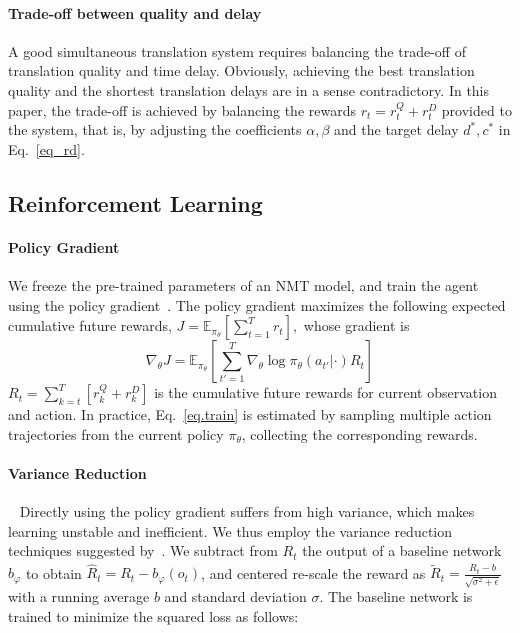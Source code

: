 \paragraph{Trade-off between quality and delay}
A good simultaneous translation system requires balancing the trade-off of translation quality and time delay. Obviously, achieving the best translation quality and the shortest translation delays are in a sense contradictory. In this paper, the trade-off is achieved by balancing the rewards $r_t = r_t^Q + r_t^D$ provided to the system, that is, by adjusting the coefficients $\alpha,\beta$ and the target delay $d^*, c^*$ in Eq.~\ref{eq_rd}. 

\subsection{Reinforcement Learning}

\paragraph{Policy Gradient}
We freeze the pre-trained parameters of an NMT model, and train the agent using the policy gradient~\cite{williams1992simple}. The policy gradient maximizes the following expected cumulative future rewards,
$     J = \mathbb{E}_{\pi_{\theta}}\left[\sum_{t=1}^T r_t\right], $ whose gradient is 
\begin{equation}
\label{eq.train}
   \nabla_{\theta}J=\mathbb{E}_{\pi_{\theta}}\left[\sum_{t'=1}^T\nabla_{\theta}\log \pi_{\theta}(a_{t'}|\cdot) R_t\right]
\end{equation}
$R_t=\sum_{k=t}^T\left[r_k^Q + r_k^D\right]$ is the cumulative future rewards for current observation and action. %
In practice, Eq.~\ref{eq.train} is estimated by sampling multiple action trajectories from the current policy $\pi_{\theta}$, collecting the corresponding rewards.

\paragraph{Variance Reduction}~
Directly using the policy gradient suffers from high variance, which makes learning unstable and inefficient. We thus employ the variance reduction techniques suggested by~\citep{mnih2014neural}. We subtract from $R_t$ the output of a baseline network $b_{\varphi}$ to obtain $\hat{R}_t = R_t - b_{\varphi}\left(o_t\right)$, and centered re-scale the reward as $\tilde{R}_t = \frac{\hat{R}_t - b}{\sqrt{\sigma^2+\epsilon}}$ with a running average $b$ and standard deviation $\sigma$. The baseline network is trained to minimize the squared loss as follows:

